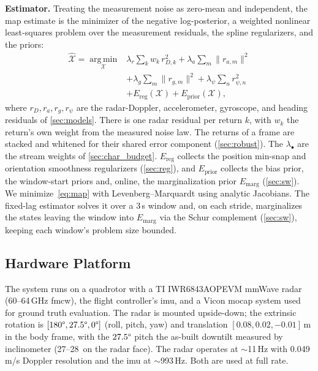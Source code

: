 \textbf{Estimator.}
Treating the measurement noise as zero-mean and independent, the
\ac{map} estimate is the minimizer of the negative
log-posterior, a weighted nonlinear least-squares problem over the
measurement residuals, the spline regularizers, and the priors:
\begin{equation}
\begin{aligned}
  \hat{\mathcal{X}} = \operatorname*{arg\,min}_{\mathcal{X}}
    & \lambda_r\!\sum_{k} w_k\, r_{D,k}^2
    + \lambda_a\!\sum_{m}\lVert r_{a,m}\rVert^2 \\
    & + \lambda_g\!\sum_{m}\lVert r_{g,m}\rVert^2
    + \lambda_\psi\!\sum_{n} r_{\psi,n}^2 \\
    & + E_{\text{reg}}(\mathcal{X})
    + E_{\text{prior}}(\mathcal{X}),
\end{aligned}
\label{eq:map}
\end{equation}
where $r_D,r_a,r_g,r_\psi$ are the radar-Doppler, accelerometer,
gyroscope, and heading residuals of \autoref{sec:models}.  There is one
radar residual per return $k$, with $w_k$ the return's own weight from
the measured noise law.  The returns of a frame are stacked and
whitened for their shared error component (\autoref{sec:robust}).  The $\lambda_\bullet$ are the stream weights of \autoref{sec:char_budget}.
$E_{\text{reg}}$ collects the position min-snap and orientation
smoothness regularizers (\autoref{sec:reg}), and $E_{\text{prior}}$
collects the bias prior, the window-start priors and, online, the
marginalization prior $E_{\mathrm{marg}}$ (\autoref{sec:sw}).  We
minimize~\eqref{eq:map} with Levenberg--Marquardt using analytic
Jacobians.  The fixed-lag estimator solves it over a 3\,s window and,
on each stride, marginalizes the states leaving the window into
$E_{\mathrm{marg}}$ via the Schur complement (\autoref{sec:sw}),
keeping each window's problem size bounded.

\subsection{Hardware Platform}
The system runs on a quadrotor with a TI IWR6843AOPEVM
mmWave radar (60--64\,GHz \ac{fmcw}), the flight controller's
\ac{imu}, and a Vicon \ac{mocap} system used for ground
truth evaluation.  The radar is mounted upside-down; the extrinsic
rotation is $[180\degree, 27.5\degree, 0\degree]$
(roll, pitch, yaw) and translation $[0.08, 0.02, -0.01]$\,m in the body
frame, with the $27.5\degree$ pitch the as-built downtilt measured by
inclinometer (27--28\degree\ on the radar face).  The radar operates at $\sim$11\,Hz with 0.049\,m/s Doppler
resolution and the \ac{imu} at $\sim$993\,Hz.  Both are used at full rate.

